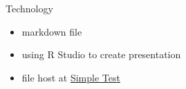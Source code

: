 \documentclass[
  ignorenonframetext,
]{beamer}
\providecommand{\tightlist}{%
  \setlength{\itemsep}{0pt}\setlength{\parskip}{0pt}}
\begin{document}
\begin{frame}{Technology}
\protect\hypertarget{technology}{}
\begin{itemize}
\tightlist
\item
  markdown file
\item
  using R Studio to create presentation
\item
  file host at
  \href{https://github.com/jackyhuynh/complete-solutions-for-php-testing-using-simpletest}{Simple
  Test}
\end{itemize}
\end{frame}
\end{document}
